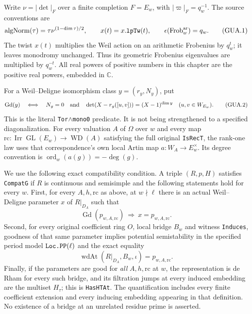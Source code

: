 \documentclass[11pt,a4paper]{article}
\numberwithin{equation}{section}
\theoremstyle{remark}\newtheorem{remark}[theorem]{Remark}
\begin{document}
Write $\nu=|\det|_F$ over a finite completion $F=E_w$, with
$|\varpi|_F=q_w^{-1}$.  The source conventions are
\[
 \operatorname{algNorm}(\tau)=\tau\nu^{(1-\dim\tau)/2},\qquad
 x(t)=x.\texttt{lp\allowbreak Tw}(t),\qquad
 \epsilon(\operatorname{Frob}^{\rm ar}_w)=q_w.        \tag{GUA.1}
\]
The twist $x(t)$ multiplies the Weil action on an arithmetic
Frobenius by $q_w^t$; it leaves monodromy unchanged.  Thus its
geometric Frobenius eigenvalues are multiplied by $q_w^{-t}$.
All real powers of positive numbers in this chapter are the
positive real powers, embedded in $\mathbb C$.

For a Weil--Deligne isomorphism class $y=(r_y,N_y)$, put
\[
 \operatorname{Gd}(y)\quad\Longleftrightarrow\quad
 N_y=0\quad\hbox{and}\quad
 \det(X-r_y([u,v]))=(X-1)^{\dim y}
                       \quad(u,v\in W_{E_w}).       \tag{GUA.2}
\]
This is the literal \texttt{Tor}$\wedge$\texttt{mono0} predicate.
It is not being strengthened to a specified diagonalization.
For every valuation $A$ of $\Omega$ over $w$ and every map
$\mathrm{rc}:\operatorname{Irr}\operatorname{GL}(E_w)
\longrightarrow\operatorname{WD}(A)$ satisfying the full original
\texttt{Is\allowbreak Rec\allowbreak T}, the rank-one law uses that correspondence's own
local Artin map $a:W_A\to E_w^\times$.  Its degree convention is
$\operatorname{ord}_w(a(g))=-\deg(g)$.

We use the following exact compatibility condition.  A triple
$(R,p,H)$ satisfies \texttt{Compat\allowbreak G} if $R$ is continuous and
semisimple and the following statements hold for every $w$.
First, for every $A,h,\mathrm{rc}$ as above, at $w\nmid\ell$
there is an actual Weil--Deligne parameter $x$ of $R|_{D_A}$
such that
\[
             \operatorname{Gd}(p_{w,A,\mathrm{rc}})
                    \ \Longrightarrow\ x=p_{w,A,\mathrm{rc}}.
                                                        \tag{GUA.3}
\]
Second, for every original coefficient ring $O$, local bridge
$B_w$ and witness \texttt{Induces}, goodness of that same
parameter implies potential semistability in the specified
period model $\texttt{Loc.\allowbreak PP}(\ell)$ and the exact equality
\[
 \operatorname{wdAt}(R|_{D_A},B_w,\iota)
                              =p_{w,A,\mathrm{rc}}.       \tag{GUA.4}
\]
Finally, if the parameters are good for \emph{all}
$A,h,\mathrm{rc}$ at $w$, the representation is de Rham for
every such bridge, and its filtration jumps at every induced
embedding are the multiset $H_\tau$; this is
\texttt{Has\allowbreak HTAt}.  The quantification includes every finite
coefficient extension and every inducing embedding appearing
in that definition.  No existence of a bridge at an unrelated
residue prime is asserted.
\end{document}
